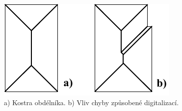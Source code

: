 \begin{figure}[th]
    \begin{center}
        \includegraphics[scale=0.9]{08_segmentace/images/img_8_27.pdf}
    \end{center}
    \caption{a) Kostra obdélníka. b) Vliv chyby způsobené digitalizací.}
    \label{img:8_27}
\end{figure}



